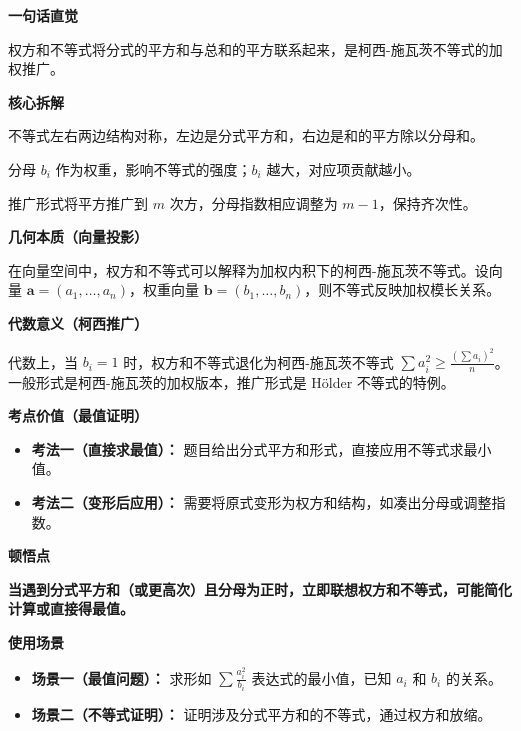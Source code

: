 \begin{explanationbox}
\textbf{\textcolor{CExplanation}{一句话直觉}}

权方和不等式将分式的平方和与总和的平方联系起来，是柯西-施瓦茨不等式的加权推广。

\medskip
\textbf{\textcolor{CExplanation}{核心拆解}}
\begin{description}[style=nextline, leftmargin=2.8em, labelsep=0.5em, itemsep=0.45em]
    \item[\textbf{要点一（结构对称）：}] 不等式左右两边结构对称，左边是分式平方和，右边是和的平方除以分母和。
    \item[\textbf{要点二（权重影响）：}] 分母 $b_i$ 作为权重，影响不等式的强度；$b_i$ 越大，对应项贡献越小。
    \item[\textbf{要点三（指数推广）：}] 推广形式将平方推广到 $m$ 次方，分母指数相应调整为 $m-1$，保持齐次性。
\end{description}

\medskip
\textbf{\textcolor{CExplanation}{几何本质（向量投影）}}

在向量空间中，权方和不等式可以解释为加权内积下的柯西-施瓦茨不等式。设向量 $\mathbf{a} = (a_1,\dots,a_n)$，权重向量 $\mathbf{b} = (b_1,\dots,b_n)$，则不等式反映加权模长关系。

\medskip
\textbf{\textcolor{CExplanation}{代数意义（柯西推广）}}

代数上，当 $b_i = 1$ 时，权方和不等式退化为柯西-施瓦茨不等式 $\sum a_i^2 \geq \frac{(\sum a_i)^2}{n}$。一般形式是柯西-施瓦茨的加权版本，推广形式是 Hölder 不等式的特例。

\medskip
\textbf{\textcolor{CExplanation}{考点价值（最值证明）}}
\begin{itemize}[leftmargin=*, itemsep=0.5em, topsep=0.4em]
    \item \textbf{考法一（直接求最值）：} 题目给出分式平方和形式，直接应用不等式求最小值。
    \item \textbf{考法二（变形后应用）：} 需要将原式变形为权方和结构，如凑出分母或调整指数。
\end{itemize}

\medskip
\textbf{\textcolor{CExplanation}{顿悟点}}

\textbf{当遇到分式平方和（或更高次）且分母为正时，立即联想权方和不等式，可能简化计算或直接得最值。}

\medskip
\textbf{\textcolor{CExplanation}{使用场景}}
\begin{itemize}[leftmargin=*, itemsep=0.5em, topsep=0.4em]
    \item \textbf{场景一（最值问题）：} 求形如 $\sum \frac{a_i^2}{b_i}$ 表达式的最小值，已知 $a_i$ 和 $b_i$ 的关系。
    \item \textbf{场景二（不等式证明）：} 证明涉及分式平方和的不等式，通过权方和放缩。
\end{itemize}
\end{explanationbox}
